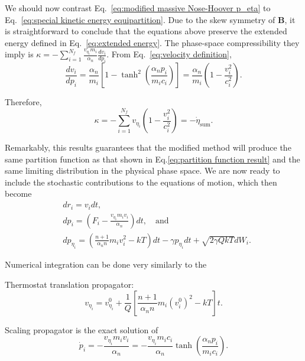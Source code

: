 \documentclass[
aip,
jcp,
reprint,
]{revtex4-1}
\newcommand{\mt}[1]{\boldsymbol{\mathbf{#1}}}          %
\newcommand{\nn}{n}
\begin{document}
We should now contrast Eq.~\eqref{eq:modified massive Nose-Hoover p_eta} to Eq.~\eqref{eq:special kinetic energy equipartition}.
Due to the skew symmetry of $\mt B$, it is straightforward to conclude that the equations above preserve the extended energy defined in Eq.~\eqref{eq:extended energy}.
The phase-space compressibility they imply is $\kappa = - \sum_{i=1}^{N_f} \frac{v_{\eta_i} m_i}{\alpha_\nn} \frac{d v_i}{d p_i}$.
From Eq.~\eqref{eq:velocity definition},
\begin{equation}
\label{eq:velocity derivative wrt momentum}
\frac{d v_i}{d p_i} = \frac{\alpha_\nn}{m_i} \left[1 - \tanh^2\left(\frac{\alpha_\nn p_i}{m_i c_i}\right)\right] = \frac{\alpha_\nn}{m_i} \left(1 - \frac{v_i^2}{c_i^2}\right).
\end{equation}

Therefore,
\begin{equation}
\kappa = - \sum_{i=1}^{N_f} v_{\eta_i} \left(1 - \frac{v_i^2}{c_i^2}\right) = -\dot{\eta}_\mathrm{sum}.
\end{equation}

Remarkably, this results guarantees that the modified method will produce the same partition function as that shown in Eq.\eqref{eq:partition function result} and the same limiting distribution in the physical phase space.
We are now ready to include the stochastic contributions to the equations of motion, which then become
\begin{subequations}
	\label{eq:modified massive Nose-Hoover-Langevin equations}
	\begin{align}
	&dr_i = v_i dt, \\
	&dp_i = \left(F_i - \frac{v_{\eta_i} m_i v_i}{\alpha_\nn}\right) dt, \quad \mathrm{and} \\
	&dp_{\eta_i} = \left(\frac{\nn+1}{\alpha_\nn \nn} m_i v_i^2 - kT\right) dt - \gamma p_{\eta_i} dt + \sqrt{2 \gamma Q kT} dW_i \label{eq:modified massive Nose-Hoover-Langevin p_eta}.
	\end{align}
\end{subequations}

Numerical integration can be done very similarly to the 

Thermostat translation propagator:
\begin{equation*}
v_{\eta_i} = v_{\eta_i}^0 + \frac{1}{Q}\left[\frac{\nn+1}{\alpha_\nn \nn} m_i (v_i^0)^2 - kT\right] t.
\end{equation*}

Scaling propagator is the exact solution of
\begin{equation*}
\dot{p}_i = -\frac{v_{\eta_i} m_i v_i}{\alpha_\nn} = -\frac{v_{\eta_i} m_i c_i}{\alpha_\nn} \tanh\left(\frac{\alpha_\nn p_i}{m_i c_i}\right).
\end{equation*}
\end{document}
